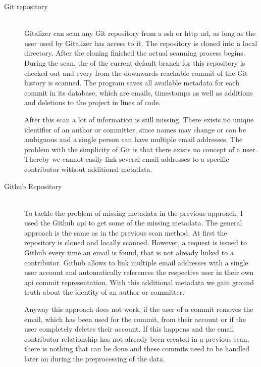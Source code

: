 \begin{description}
    \item[Git repository]\label{stand-alone-repository-scan} \hfill \\
        Gitalizer can scan any Git repository from a \ac{ssh} or \ac{http} \acs{url}, as long as the user used by Gitalizer has access to it.
        The repository is cloned into a local directory.
        After the cloning finished the actual scanning process begins.
        During the scan, the  of the current default branch for this repository is checked out and every from the  downwards reachable commit of the Git history is scanned.
        The program saves all available metadata for each commit in its database, which are emails, timestamps as well as additions and deletions to the project in lines of code.

        After this scan a lot of information is still missing.
        There exists no unique identifier of an author or committer, since names may change or can be ambiguous and a single person can have multiple email addresses.
        The problem with the simplicity of Git is that there exists no concept of a user.
        Thereby we cannot easily link several email addresses to a specific contributor without additional metadata.


    \item[Github Repository]\label{github-repo-scan} \hfill \\
        To tackle the problem of missing metadata in the previous approach, I used the Github \ac{api} to get some of the missing metadata.
        The general approach is the same as in the previous scan method.
        At first the repository is cloned and locally scanned.
        However, a request is issued to Github every time an email is found, that is not already linked to a contributor.
        Github allows to link multiple email addresses with a single user account and automatically references the respective user in their own \ac{api} commit representation.
        With this additional metadata we gain ground truth about the identity of an author or committer.

        Anyway this approach does not work, if the user of a commit removes the email, which has been used for the commit, from their account or if the user completely deletes their account.
        If this happens and the email contributor relationship has not already been created in a previous scan, there is nothing that can be done and these commits need to be handled later on during the preprocessing of the data.


\end{description}
